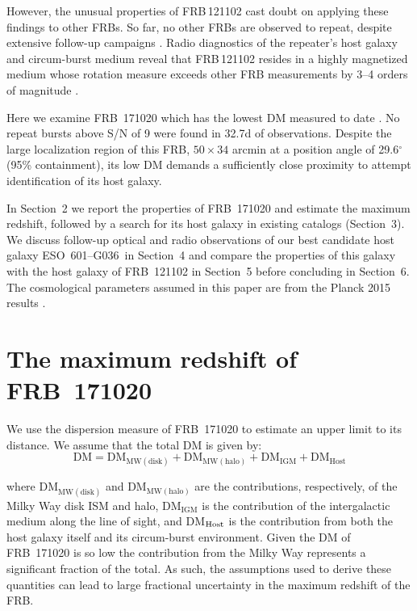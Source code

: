\documentclass[twocolumn]{aastex63}
\newcommand{\galname}{ESO~601--G036}
\begin{document}
However, the unusual properties of FRB\,121102 cast doubt on 
applying these findings to other FRBs.  So far, no other FRBs are observed to repeat, 
despite extensive follow-up campaigns \citep[e.g.][]{Bhandari2018}. Radio diagnostics of the repeater's host galaxy and circum-burst medium reveal that FRB\,121102 resides in a highly magnetized medium \citep{Michillietal2018} whose rotation measure exceeds other FRB measurements by 3--4 orders of magnitude \citep{Masuietal2015,Petroffetal2017,Calebetal2018}. 

Here we examine FRB~171020 which has the lowest DM measured
to date \citep[114\,pc\,cm$^{-3}$;][]{shannon2018}. No repeat bursts above S/N of 9 were found in 32.7d of observations. Despite the large localization region of this FRB, 
$50 \times 34$ arcmin  at a position angle of 29.6$^\circ$ (95\% containment), its low DM demands a sufficiently close
proximity to attempt identification of its host galaxy. 

In Section~2 we report the properties of FRB~171020 and estimate the maximum redshift, followed by a search for its host galaxy in existing catalogs (Section~3). We discuss follow-up optical and radio observations of our best candidate host galaxy \galname\ in Section~4 and compare the properties of this galaxy with the host galaxy of FRB~121102 in Section~5 before concluding in Section~6. The cosmological parameters assumed in this paper are from the Planck 2015 results \citep{planck2016}. 

\section{The maximum redshift of FRB~171020} \label{sec:dm}

We use the dispersion measure of FRB~171020 to estimate an upper limit to its distance. 
We assume that the total DM is given by:
$$\mathrm{DM}=\mathrm{DM_{MW(disk)}} + \mathrm{DM_{MW(halo)}} + \mathrm{DM_{IGM}} + \mathrm{DM_{Host}}$$ 

\noindent where $\mathrm{DM_{MW(disk)}}$ and $\mathrm{DM_{MW(halo)}}$ are the contributions, respectively, of the Milky Way disk ISM and halo, $\mathrm{DM_{IGM}}$ is the contribution of the intergalactic medium along the line of sight, and DM$_{\rm Host}$ is the contribution from both the host galaxy itself and its circum-burst environment. Given the DM of FRB~171020 is so low the contribution from the Milky Way represents a significant fraction of the total. As such, the assumptions used to derive these quantities can lead to large fractional
uncertainty in the maximum redshift of the FRB. 
\end{document}
